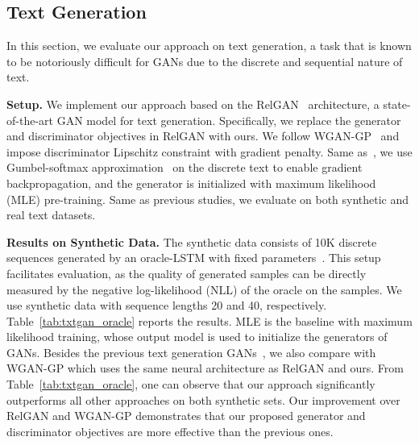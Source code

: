 \documentclass{article}
\newcommand{\0}{\bm{0}}
\begin{document}
\subsection{Text Generation}\label{sec:exp:text}
In this section, we evaluate our approach on text generation, a task that is known to be notoriously difficult for GANs due to the discrete and sequential nature of text. 

\textbf{Setup.} We implement our approach based on the RelGAN~\cite{nie2018relgan} architecture, a state-of-the-art GAN model for text generation. Specifically, 
we replace the generator and discriminator objectives in RelGAN with ours. We follow WGAN-GP~\cite{wgangp} and impose discriminator Lipschitz constraint with gradient penalty. 
Same as~\cite{nie2018relgan}, we use  Gumbel-softmax approximation~\cite{jang2016categorical,maddison2016concrete} on the discrete text to enable gradient backpropagation, and the generator is initialized with maximum likelihood (MLE) pre-training. 
Same as previous studies, we evaluate on both synthetic and real text datasets. 


\textbf{Results on Synthetic Data.} 
The synthetic data consists of 10K discrete sequences generated by an oracle-LSTM with fixed parameters~\cite{yu2017seqgan}. This setup facilitates evaluation, as the quality of generated samples can  be directly measured by  the negative log-likelihood (NLL) of the oracle on the samples. We use synthetic data with sequence lengths 20 and 40, respectively. Table~\ref{tab:txtgan_oracle} reports the results. MLE is the baseline with maximum likelihood training, whose output model is used to initialize the generators of GANs. Besides the previous text generation GANs~\cite{yu2017seqgan,guo2018long,nie2018relgan}, we also compare with WGAN-GP which uses the same neural architecture as RelGAN and ours. From Table~\ref{tab:txtgan_oracle}, one can observe that  our approach significantly outperforms all other approaches on both synthetic sets. Our improvement over RelGAN and WGAN-GP demonstrates that our proposed generator and discriminator objectives are more effective than the previous ones. 
\end{document}
